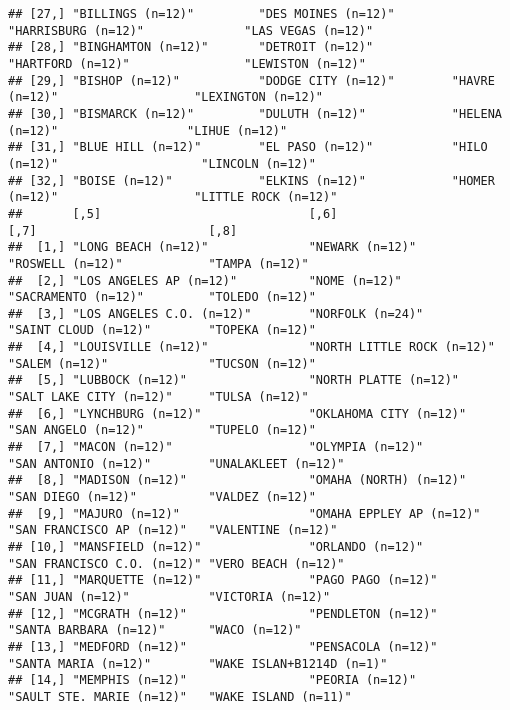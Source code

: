 \documentclass[
]{book}
\begin{document}
\begin{verbatim}
## [27,] "BILLINGS (n=12)"         "DES MOINES (n=12)"        "HARRISBURG (n=12)"              "LAS VEGAS (n=12)"          
## [28,] "BINGHAMTON (n=12)"       "DETROIT (n=12)"           "HARTFORD (n=12)"                "LEWISTON (n=12)"           
## [29,] "BISHOP (n=12)"           "DODGE CITY (n=12)"        "HAVRE (n=12)"                   "LEXINGTON (n=12)"          
## [30,] "BISMARCK (n=12)"         "DULUTH (n=12)"            "HELENA (n=12)"                  "LIHUE (n=12)"              
## [31,] "BLUE HILL (n=12)"        "EL PASO (n=12)"           "HILO (n=12)"                    "LINCOLN (n=12)"            
## [32,] "BOISE (n=12)"            "ELKINS (n=12)"            "HOMER (n=12)"                   "LITTLE ROCK (n=12)"        
##       [,5]                             [,6]                       [,7]                        [,8]                         
##  [1,] "LONG BEACH (n=12)"              "NEWARK (n=12)"            "ROSWELL (n=12)"            "TAMPA (n=12)"               
##  [2,] "LOS ANGELES AP (n=12)"          "NOME (n=12)"              "SACRAMENTO (n=12)"         "TOLEDO (n=12)"              
##  [3,] "LOS ANGELES C.O. (n=12)"        "NORFOLK (n=24)"           "SAINT CLOUD (n=12)"        "TOPEKA (n=12)"              
##  [4,] "LOUISVILLE (n=12)"              "NORTH LITTLE ROCK (n=12)" "SALEM (n=12)"              "TUCSON (n=12)"              
##  [5,] "LUBBOCK (n=12)"                 "NORTH PLATTE (n=12)"      "SALT LAKE CITY (n=12)"     "TULSA (n=12)"               
##  [6,] "LYNCHBURG (n=12)"               "OKLAHOMA CITY (n=12)"     "SAN ANGELO (n=12)"         "TUPELO (n=12)"              
##  [7,] "MACON (n=12)"                   "OLYMPIA (n=12)"           "SAN ANTONIO (n=12)"        "UNALAKLEET (n=12)"          
##  [8,] "MADISON (n=12)"                 "OMAHA (NORTH) (n=12)"     "SAN DIEGO (n=12)"          "VALDEZ (n=12)"              
##  [9,] "MAJURO (n=12)"                  "OMAHA EPPLEY AP (n=12)"   "SAN FRANCISCO AP (n=12)"   "VALENTINE (n=12)"           
## [10,] "MANSFIELD (n=12)"               "ORLANDO (n=12)"           "SAN FRANCISCO C.O. (n=12)" "VERO BEACH (n=12)"          
## [11,] "MARQUETTE (n=12)"               "PAGO PAGO (n=12)"         "SAN JUAN (n=12)"           "VICTORIA (n=12)"            
## [12,] "MCGRATH (n=12)"                 "PENDLETON (n=12)"         "SANTA BARBARA (n=12)"      "WACO (n=12)"                
## [13,] "MEDFORD (n=12)"                 "PENSACOLA (n=12)"         "SANTA MARIA (n=12)"        "WAKE ISLAN+B1214D (n=1)"    
## [14,] "MEMPHIS (n=12)"                 "PEORIA (n=12)"            "SAULT STE. MARIE (n=12)"   "WAKE ISLAND (n=11)"         

\end{verbatim}
\end{document}
